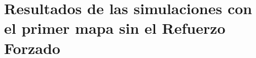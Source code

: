 \documentclass[conference]{IEEEtran}
\begin{document}


\section{Resultados de las simulaciones con el primer mapa sin el Refuerzo Forzado}
\end{document}
